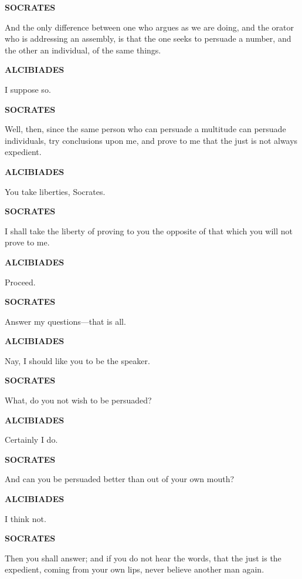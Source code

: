 \documentclass[11pt,letter]{article}
\begin{document}
\par \textbf{SOCRATES}
\par   And the only difference between one who argues as we are doing, and the orator who is addressing an assembly, is that the one seeks to persuade a number, and the other an individual, of the same things.

\par \textbf{ALCIBIADES}
\par   I suppose so.

\par \textbf{SOCRATES}
\par   Well, then, since the same person who can persuade a multitude can persuade individuals, try conclusions upon me, and prove to me that the just is not always expedient.

\par \textbf{ALCIBIADES}
\par   You take liberties, Socrates.

\par \textbf{SOCRATES}
\par   I shall take the liberty of proving to you the opposite of that which you will not prove to me.

\par \textbf{ALCIBIADES}
\par   Proceed.

\par \textbf{SOCRATES}
\par   Answer my questions—that is all.

\par \textbf{ALCIBIADES}
\par   Nay, I should like you to be the speaker.

\par \textbf{SOCRATES}
\par   What, do you not wish to be persuaded?

\par \textbf{ALCIBIADES}
\par   Certainly I do.

\par \textbf{SOCRATES}
\par   And can you be persuaded better than out of your own mouth?

\par \textbf{ALCIBIADES}
\par   I think not.

\par \textbf{SOCRATES}
\par   Then you shall answer; and if you do not hear the words, that the just is the expedient, coming from your own lips, never believe another man again.
\end{document}
